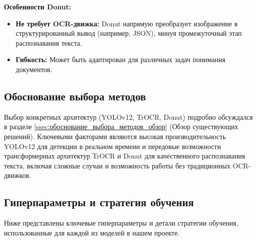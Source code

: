 \documentclass[12pt, a4paper]{article}
\theoremstyle{definition}
\theoremstyle{remark}
\begin{document}
	\textbf{Особенности Donut:}
	\begin{itemize}
		\item \textbf{Не требует OCR-движка:} Donut напрямую преобразует изображение в структурированный вывод (например, JSON), минуя промежуточный этап распознавания текста.
		\item \textbf{Гибкость:} Может быть адаптирован для различных задач понимания документов.
	\end{itemize}
	
	\subsection{Обоснование выбора методов}
	Выбор конкретных архитектур (YOLOv12, TrOCR, Donut) подробно обсуждался в разделе \ref{ssec:обоснование_выбора_методов_обзор} (Обзор существующих решений). Ключевыми факторами являются высокая производительность YOLOv12 для детекции в реальном времени и передовые возможности трансформерных архитектур TrOCR и Donut для качественного распознавания текста, включая сложные случаи и возможность работы без традиционных OCR-движков.
	\label{ssec:обоснование_выбора_методов_разработка}
	
	\subsection{Гиперпараметры и стратегия обучения}
	Ниже представлены ключевые гиперпараметры и детали стратегии обучения, использованные для каждой из моделей в нашем проекте.
	
\end{document}
